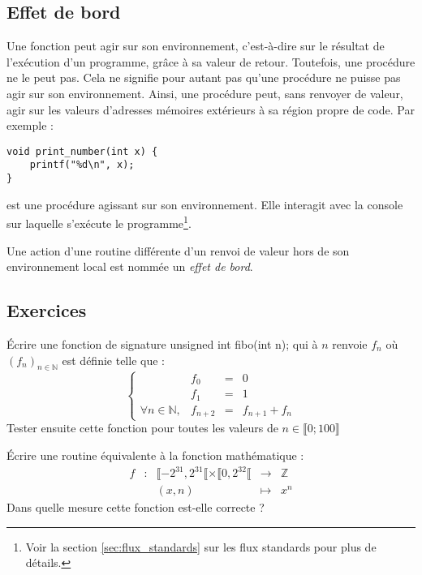 \documentclass[../../../main.tex]{subfiles}
\begin{document}
\subsection{Effet de bord}
\label{sub:effet_de_bord}
Une fonction peut agir sur son environnement, c'est-à-dire sur le résultat de l'exécution d'un programme, grâce à sa valeur de retour. Toutefois, une procédure ne le peut pas. Cela ne signifie pour autant pas qu'une procédure ne puisse pas agir sur son environnement. Ainsi, une procédure peut, sans renvoyer de valeur, agir sur les valeurs d'adresses mémoires extérieurs à sa région propre de code. Par exemple :
\begin{verbatim}
void print_number(int x) {
	printf("%d\n", x);
}
\end{verbatim}
est une procédure agissant sur son environnement. Elle interagit avec la console sur laquelle s'exécute le programme\footnote{Voir la section \ref{sec:flux_standards} sur les flux standards pour plus de détails.}.

Une action d'une routine différente d'un renvoi de valeur hors de son environnement local est nommée un \textit{effet de bord}.
\subsection{Exercices}
\newline Écrire une fonction de signature \textsf{unsigned int fibo(int n);} qui à $n$ renvoie $f_{n}$ où $(f_{n})_{n\in{\mathbb{N}}}$ est définie telle que :
 $$
\left\{\begin{array}{llcl}
& f_{0} & = & 0 \\
& f_{1} & = & 1 \\
\forall{n\in{\mathbb{N}}}, & f_{n+2} & = & f_{n+1} + f_{n}
\end{array}\right.
$$
Tester ensuite cette fonction pour toutes les valeurs de $n\in{\llbracket 0; 100\rrbracket}$
 
 Écrire une routine équivalente à la fonction mathématique :
 $$
 \begin{array}{lclcl}
f & : & \llbracket-2^{31}, 2^{31}\llbracket\times{\llbracket0, 2^{32}\llbracket}& \rightarrow & \mathbb{Z} \\
& & (x, n) & \mapsto & x^{n}
\end{array}
$$
Dans quelle mesure cette fonction est-elle correcte ?
\end{document}
